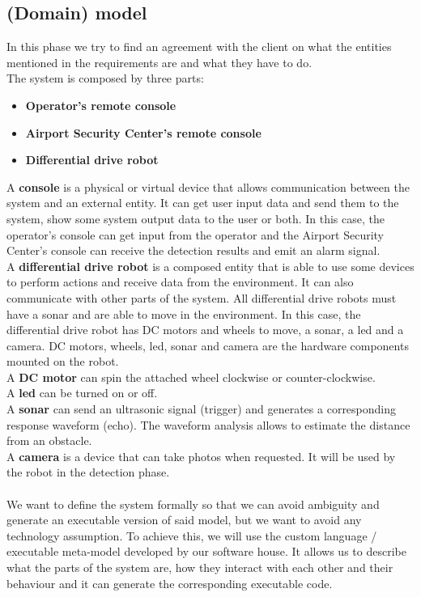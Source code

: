 \documentclass{llncs}
\newcommand{\labelssec}[1]{\label{ssec:#1}}
\begin{document}
\subsection{(Domain) model}
\labelssec{Domain model}
In this phase we try to find an agreement with the client on what the entities mentioned in the requirements are and what they have to do.\\The system is composed by three parts:
\begin{itemize}
\item \textbf{Operator's remote console}
\item \textbf{Airport Security Center's remote console}
\item \textbf{Differential drive robot}
\end{itemize}
A \textbf{console} is a physical or virtual device that allows communication between the system and an external entity. It can get user input data and send them to the system, show some system output data to the user or both. In this case, the operator's console can get input from the operator and the Airport Security Center's console can receive the detection results and emit an alarm signal.
\\A \textbf{differential drive robot} is a composed entity that is able to use some devices to perform actions and receive data from the environment. It can also communicate with other parts of the system. All differential drive robots must have a sonar and are able to move in the environment. In this case, the differential drive robot has DC motors and wheels to move, a sonar, a led and a camera.
DC motors, wheels, led, sonar and camera are the hardware components mounted on the robot.
\\A \textbf{DC motor} can spin the attached wheel clockwise or counter-clockwise.
\\A \textbf{led} can be turned on or off.
\\A \textbf{sonar} can send an ultrasonic signal (trigger) and generates a corresponding response waveform (echo). The waveform analysis allows to estimate the distance from an obstacle.
\\ A \textbf{camera} is a device that can take photos when requested. It will be used by the robot in the detection phase.\\ \\
We want to define the system formally so that we can avoid ambiguity and generate an executable version of said model, but we want to avoid any technology assumption. To achieve this, we will use the custom language / executable meta-model developed by our software house. It allows us to describe what the parts of the system are, how they interact with each other and their behaviour and it can generate the corresponding executable code.\\ \\
\end{document}
